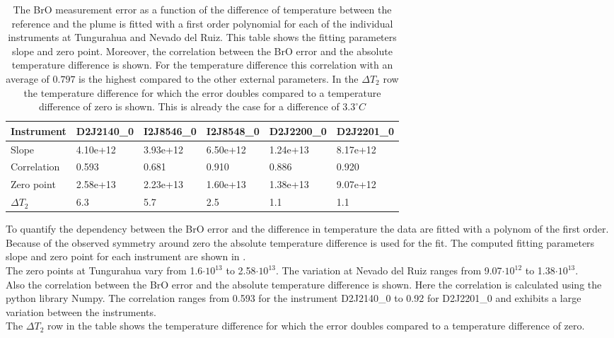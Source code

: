 \begin{table}[h]
	\begin{tabular}{|p{2cm}|p{2cm}|p{2cm}|p{2cm}|p{2cm}|p{2cm}|}
		Instrument	&D2J2140\_0&I2J8546\_0& I2J8548\_0&D2J2200\_0&D2J2201\_0\\
		\toprule
		Slope&4.10e+12 &3.93e+12 &6.50e+12 &1.24e+13&8.17e+12 \\
		\midrule
		Correlation
		& 
		0.593& 
		0.681& 
		0.910& 
		0.886& 
		0.920\\
		\midrule
		Zero point&2.58e+13&2.23e+13&1.60e+13& 1.38e+13& 9.07e+12\\
		\midrule
		$\Delta T_{2}$&6.3&5.7&2.5&1.1&1.1\\
		\bottomrule
	\end{tabular}
	\label{tab:tempe}
	\caption{The BrO measurement error as a function of the difference of temperature between the reference and the plume is fitted with a first order polynomial for each of the individual instruments at Tungurahua and Nevado del Ruiz. This table shows the fitting parameters slope and zero point. Moreover, the correlation between the BrO error and the absolute temperature difference is shown. For the temperature difference this correlation with an average of $0.797$ is the highest compared to the other external parameters. In the $\Delta T_{2}$ row the temperature difference for which the error doubles compared to a temperature difference of zero is shown. This is already the case for a difference of $3.3^\circ C$}
\end{table}
To quantify the dependency between the BrO error and the difference in temperature the data are fitted with a polynom of the first order. Because of the observed symmetry around zero the absolute temperature difference is used for the fit. The computed fitting parameters slope and zero point for each instrument are shown in . \\
The zero points at Tungurahua vary from 1.6$\cdot10^{13}$ to 2.58$\cdot10^{13}$. The variation at Nevado del Ruiz ranges from  9.07$\cdot10^{12}$ to 1.38$\cdot10^{13}$.\\
Also the correlation between the BrO error and the absolute temperature difference is shown. Here the correlation is calculated using the python library Numpy. The correlation ranges from 0.593 for the instrument D2J2140\_0 to  0.92 for D2J2201\_0 and exhibits a large variation between the instruments.\\
The $\Delta T_{2}$ row in the table shows the temperature difference for which the error doubles compared to a temperature difference of zero.
